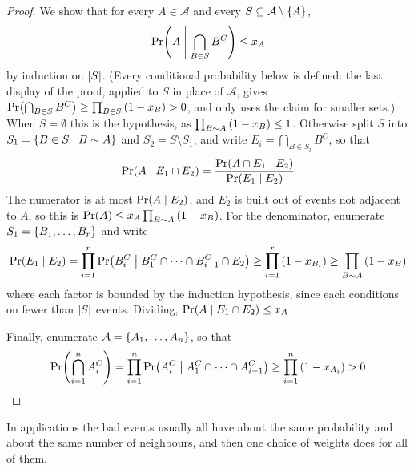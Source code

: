 \begin{proof}
    We show that for every $A \in \mathcal{A}$ and every $S \subseteq \mathcal{A} \setminus \left\{ A \right\}$,
    \begin{align*}
        \Pr\!\left( A \;\middle\vert\; \bigcap_{B \in S} B^C \right) \leq x_A
    \end{align*}
    by induction on $\left\lvert S \right\rvert$. (Every conditional probability below is defined: the last display of the proof, applied to $S$ in place of $\mathcal{A}$, gives $\Pr\!\left( \bigcap_{B \in S} B^C \right) \geq \prod_{B \in S} \left( 1 - x_B \right) > 0$, and only uses the claim for smaller sets.) When $S = \emptyset$ this is the hypothesis, as $\prod_{B \sim A} \left( 1 - x_B \right) \leq 1$. Otherwise split $S$ into $S_1 = \left\{ B \in S \; \middle\vert \; B \sim A \right\}$ and $S_2 = S \setminus S_1$, and write $E_i = \bigcap_{B \in S_i} B^C$, so that
    \begin{align*}
        \Pr\!\left( A \mid E_1 \cap E_2 \right) = \frac{\Pr\!\left( A \cap E_1 \mid E_2 \right)}{\Pr\!\left( E_1 \mid E_2 \right)}
    \end{align*}
    The numerator is at most $\Pr\!\left( A \mid E_2 \right)$, and $E_2$ is built out of events not adjacent to $A$, so this is $\Pr\!\left( A \right) \leq x_A \prod_{B \sim A} \left( 1 - x_B \right)$. For the denominator, enumerate $S_1 = \left\{ B_1, \ldots, B_r \right\}$ and write
    \begin{align*}
        \Pr\!\left( E_1 \mid E_2 \right) = \prod_{i = 1}^{r} \Pr\!\left( B_i^C \;\middle\vert\; B_1^C \cap \cdots \cap B_{i - 1}^C \cap E_2 \right) \geq \prod_{i = 1}^{r} \left( 1 - x_{B_i} \right) \geq \prod_{B \sim A} \left( 1 - x_B \right)
    \end{align*}
    where each factor is bounded by the induction hypothesis, since each conditions on fewer than $\left\lvert S \right\rvert$ events. Dividing, $\Pr\!\left( A \mid E_1 \cap E_2 \right) \leq x_A$.

    Finally, enumerate $\mathcal{A} = \left\{ A_1, \ldots, A_n \right\}$, so that
    \begin{align*}
        \Pr\!\left( \bigcap_{i = 1}^{n} A_i^C \right) = \prod_{i = 1}^{n} \Pr\!\left( A_i^C \;\middle\vert\; A_1^C \cap \cdots \cap A_{i - 1}^C \right) \geq \prod_{i = 1}^{n} \left( 1 - x_{A_i} \right) > 0
    \end{align*}
\end{proof}

In applications the bad events usually all have about the same probability and about the same number of neighbours, and then one choice of weights does for all of them.

